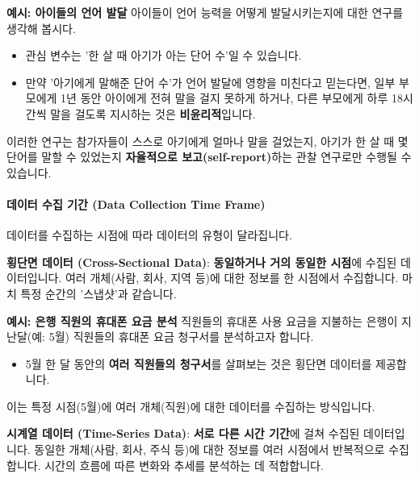 \documentclass[11pt,a4paper]{book}
\newcommand{\concept}[1]{\textbf{#1}}
\theoremstyle{definition}
\begin{document}
\begin{examplebox}
\textbf{예시: 아이들의 언어 발달}
아이들이 언어 능력을 어떻게 발달시키는지에 대한 연구를 생각해 봅시다.
\begin{itemize}
    \item 관심 변수는 '한 살 때 아기가 아는 단어 수'일 수 있습니다.
    \item 만약 '아기에게 말해준 단어 수'가 언어 발달에 영향을 미친다고 믿는다면, 일부 부모에게 1년 동안 아이에게 전혀 말을 걸지 못하게 하거나, 다른 부모에게 하루 18시간씩 말을 걸도록 지시하는 것은 \textbf{비윤리적}입니다.
\end{itemize}
이러한 연구는 참가자들이 스스로 아기에게 얼마나 말을 걸었는지, 아기가 한 살 때 몇 단어를 말할 수 있었는지 \textbf{자율적으로 보고(self-report)}하는 관찰 연구로만 수행될 수 있습니다.
\end{examplebox}

\paragraph{데이터 수집 기간 (Data Collection Time Frame)}
데이터를 수집하는 시점에 따라 데이터의 유형이 달라집니다.

\begin{tcolorbox}[infobox, title={데이터 수집 기간 (1/2): 횡단면 데이터 (Cross-Sectional Data)}]
\concept{횡단면 데이터 (Cross-Sectional Data)}: \textbf{동일하거나 거의 동일한 시점}에 수집된 데이터입니다. 여러 개체(사람, 회사, 지역 등)에 대한 정보를 한 시점에서 수집합니다. 마치 특정 순간의 '스냅샷'과 같습니다.
\end{tcolorbox}

\begin{examplebox}
\textbf{예시: 은행 직원의 휴대폰 요금 분석}
직원들의 휴대폰 사용 요금을 지불하는 은행이 지난달(예: 5월) 직원들의 휴대폰 요금 청구서를 분석하고자 합니다.
\begin{itemize}
    \item 5월 한 달 동안의 \textbf{여러 직원들의 청구서}를 살펴보는 것은 횡단면 데이터를 제공합니다.
\end{itemize}
이는 특정 시점(5월)에 여러 개체(직원)에 대한 데이터를 수집하는 방식입니다.
\end{examplebox}

\begin{tcolorbox}[infobox, title={데이터 수집 기간 (2/2): 시계열 데이터 (Time-Series Data)}]
\concept{시계열 데이터 (Time-Series Data)}: \textbf{서로 다른 시간 기간}에 걸쳐 수집된 데이터입니다. 동일한 개체(사람, 회사, 주식 등)에 대한 정보를 여러 시점에서 반복적으로 수집합니다. 시간의 흐름에 따른 변화와 추세를 분석하는 데 적합합니다.
\end{tcolorbox}
\end{document}
